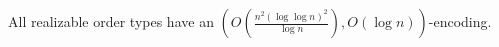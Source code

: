 \begin{theorem}\label{thm:realizable}
  All realizable order types have an
  \((O(\frac{n^2 {(\log \log n)}^2}{\log n}), O(\log n))\)-encoding.
\end{theorem}
